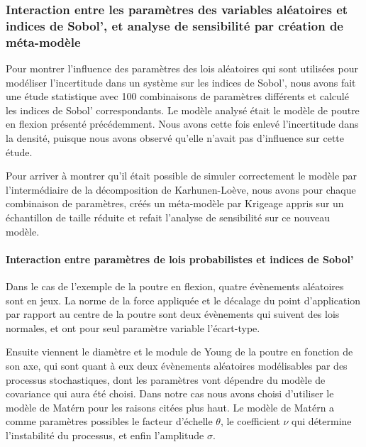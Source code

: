 \documentclass[a4paper,10pt]{article}
\begin{document}
\subsubsection{Interaction entre les paramètres des variables aléatoires et indices de Sobol', et analyse de sensibilité par création de méta-modèle}
Pour montrer l'influence des paramètres des lois aléatoires qui sont utilisées pour modéliser l'incertitude dans un système sur les indices de Sobol', nous avons fait une étude statistique avec 100 combinaisons de paramètres différents et calculé les indices de Sobol' correspondants. Le modèle analysé était le modèle de poutre en flexion présenté précédemment. Nous avons cette fois enlevé l'incertitude dans la densité, puisque nous avons observé qu'elle n'avait pas d'influence sur cette étude. \par \smallskip
Pour arriver à montrer qu'il était possible de simuler correctement le modèle par l'intermédiaire de la décomposition de Karhunen-Loève, nous avons pour chaque combinaison de paramètres, créés un méta-modèle par Krigeage appris sur un échantillon de taille réduite et refait l'analyse de sensibilité sur ce nouveau modèle. \par \bigskip

\paragraph{Interaction entre paramètres de lois probabilistes et indices de Sobol'}
Dans le cas de l'exemple de la poutre en flexion, quatre évènements aléatoires sont en jeux. La norme de la force appliquée et le décalage du point d'application par rapport au centre de la poutre sont deux évènements qui suivent des lois normales, et ont pour seul paramètre variable l'écart-type. \par \smallskip

Ensuite viennent le diamètre et le module de Young de la poutre en fonction de son axe, qui sont quant à eux deux évènements aléatoires modélisables par des processus stochastiques, dont les paramètres vont dépendre du modèle de covariance qui aura été choisi. Dans notre cas nous avons choisi d'utiliser le modèle de Matérn pour les raisons citées plus haut. Le modèle de Matérn a comme paramètres possibles le facteur d'échelle $\theta$, le coefficient $\nu$ qui détermine l'instabilité du processus, et enfin l'amplitude $\sigma$. \par \smallskip 
\end{document}
